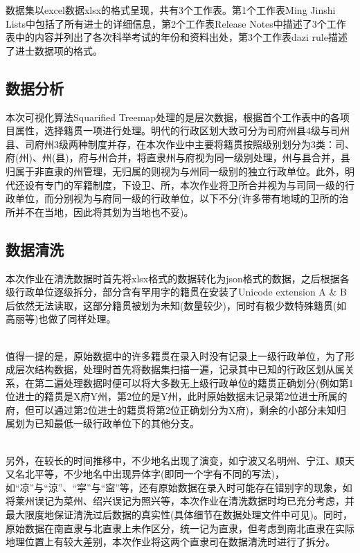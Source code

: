 \documentclass[11pt]{article}
\begin{document}
	数据集以excel数据xlsx的格式呈现，共有3个工作表。第1个工作表Ming Jinshi Lists中包括了所有进士的详细信息，第2个工作表Release Notes中描述了3个工作表中的内容并列出了各次科举考试的年份和资料出处，第3个工作表dazi rule描述了进士数据项的格式。
	
	\subsection{数据分析}
	本次可视化算法Squarified Treemap处理的是层次数据，根据首个工作表中的各项目属性，选择籍贯一项进行处理。明代的行政区划大致可分为司府州县4级与司州县、司府州3级两种制度并存，在本次作业中主要将籍贯按照级别划分为3类：司、府(州)、州(县)，府与州合并，将直隶州与府视为同一级别处理，州与县合并，县归属于非直隶的州管理，无归属的则视为与州同一级别的独立行政单位。此外，明代还设有专门的军籍制度，下设卫、所，本次作业将卫所合并视为与司同一级的行政单位，而分别视为与府同一级的行政单位，以下不分(许多带有地域的卫所的治所并不在当地，因此将其划为当地也不妥)。
	
	\subsection{数据清洗}
	本次作业在清洗数据时首先将xlsx格式的数据转化为json格式的数据，之后根据各级行政单位逐级拆分，部分含有罕用字的籍贯在安装了Unicode extension A \& B后依然无法读取，这部分籍贯被划为未知(数量较少)，同时有极少数特殊籍贯(如高丽等)也做了同样处理。
	
	\hspace*{\fill} \\
	
	值得一提的是，原始数据中的许多籍贯在录入时没有记录上一级行政单位，为了形成层次结构数据，处理时首先将数据集扫描一遍，记录其中已知的行政区划从属关系，在第二遍处理数据时便可以将大多数无上级行政单位的籍贯正确划分(例如第1位进士的籍贯是X府Y州，第2位的是Y州，此时原始数据未记录第2位进士所属的府，但可以通过第2位进士的籍贯将第2位正确划分为X府)，剩余的小部分未知归属划为已知最低一级行政单位下的其他分支。
	
	\hspace*{\fill} \\
	
	另外，在较长的时间推移中，不少地名出现了演变，如宁波又名明州、宁江、顺天又名北平等，不少地名中出现异体字(即同一个字有不同的写法)，如“凉”与“涼”、“寜”与“寍”等，还有原始数据在录入时可能存在错别字的现象，如将莱州误记为菜州、绍兴误记为照兴等，本次作业在清洗数据时均已充分考虑，并最大限度地保证清洗过后数据的真实性(具体细节在数据处理文件中可见)。同时，原始数据在南直隶与北直隶上未作区分，统一记为直隶，但考虑到南北直隶在实际地理位置上有较大差别，本次作业将这两个直隶司在数据清洗时进行了拆分。
	
\end{document}
